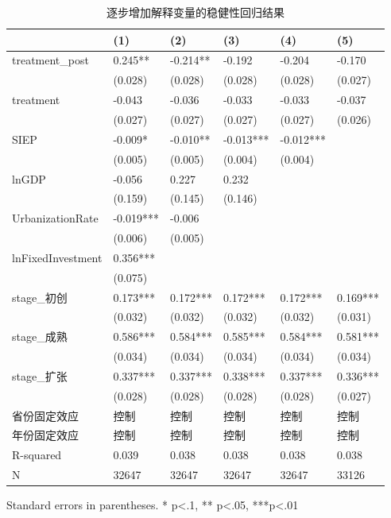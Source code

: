 \begin{table}
\caption{逐步增加解释变量的稳健性回归结果}
\label{}
\begin{center}
\begin{tabular}{llllll}
\hline
                  & (1)       & (2)       & (3)       & (4)       & (5)        \\
\hline
treatment\_post   & 0.245**     & -0.214**    & -0.192    & -0.204    & -0.170     \\
                  & (0.028)   & (0.028)   & (0.028)   & (0.028)   & (0.027)    \\
treatment         & -0.043    & -0.036    & -0.033    & -0.033    & -0.037     \\
                  & (0.027)   & (0.027)   & (0.027)   & (0.027)   & (0.026)    \\
SIEP            & -0.009*   & -0.010**  & -0.013*** & -0.012*** &            \\
                  & (0.005)   & (0.005)   & (0.004)   & (0.004)   &            \\
lnGDP             & -0.056    & 0.227     & 0.232     &           &            \\
                  & (0.159)   & (0.145)   & (0.146)   &           &            \\
UrbanizationRate              & -0.019*** & -0.006    &           &           &            \\
                  & (0.006)   & (0.005)   &           &           &            \\
lnFixedInvestment & 0.356***  &           &           &           &            \\
                  & (0.075)   &           &           &           &            \\
stage\_初创         & 0.173***  & 0.172***  & 0.172***  & 0.172***  & 0.169***   \\
                  & (0.032)   & (0.032)   & (0.032)   & (0.032)   & (0.031)    \\
stage\_成熟         & 0.586***  & 0.584***  & 0.585***  & 0.584***  & 0.581***   \\
                  & (0.034)   & (0.034)   & (0.034)   & (0.034)   & (0.034)    \\
stage\_扩张         & 0.337***  & 0.337***  & 0.338***  & 0.337***  & 0.336***   \\
                  & (0.028)   & (0.028)   & (0.028)   & (0.028)   & (0.027)    \\
省份固定效应  & 控制 & 控制 & 控制 & 控制 & 控制 \\ 
 年份固定效应  & 控制 & 控制 & 控制 & 控制 & 控制 \\ 
\hline

R-squared         & 0.039     & 0.038     & 0.038     & 0.038     & 0.038      \\
N                 & 32647     & 32647     & 32647     & 32647     & 33126      \\
\hline
\end{tabular}
\end{center}
\end{table}
\bigskip
Standard errors in parentheses. \newline 
* p<.1, ** p<.05, ***p<.01

